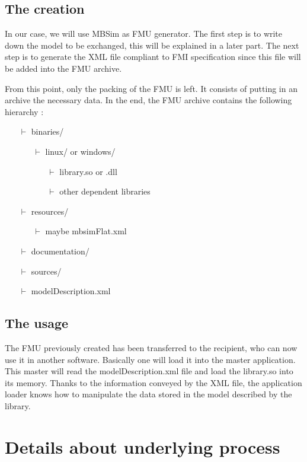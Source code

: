 \documentclass[10pt,a4paper]{report}
\begin{document}
\subsection*{The creation}
In our case, we will use MBSim as FMU generator. The first step is to write down the model to be exchanged, this will be explained in a later part. The next step is to generate the XML file compliant to FMI specification since this file will be added into the FMU archive.\par
%
From this point, only the packing of the FMU is left. It consists of putting in an archive the necessary data. In the end, the FMU archive contains the following hierarchy :
\begin{itemize}
\item[$\vdash$] binaries/
	\begin{itemize}
	\item[$\vdash$] linux/ or windows/
		\begin{itemize}
		\item[$\vdash$] library.so or .dll
		\item[$\vdash$] other dependent libraries
		\end{itemize}
	\end{itemize}
\item[$\vdash$] resources/
	\begin{itemize}
	\item[$\vdash$] maybe mbsimFlat.xml
	\end{itemize}
\item[$\vdash$] documentation/
\item[$\vdash$] sources/
\item[$\vdash$] modelDescription.xml
\end{itemize}
%
\subsection*{The usage}
The FMU previously created has been transferred to the recipient, who can now use it in another software. Basically one will load it into the master application. This master will read the modelDescription.xml file and load the library.so into its memory. Thanks to the information conveyed by the XML file, the application loader knows how to manipulate the data stored in the model described by the library.
%
\section{Details about underlying process}
%
\end{document}
